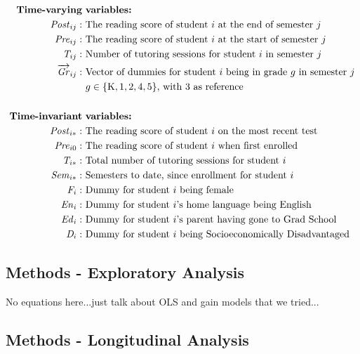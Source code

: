\documentclass[a0,landscape]{a0poster}
\begin{document}
\begin{multicols}{3}
\begin{align*}
\text{\textbf{Time-varying}} & \text{ \textbf{variables:}} \\
\mathit{Post}_{ij}: & \text{ The reading score of student } i \text{ at the end of semester } j \\
\mathit{Pre}_{ij}: & \text{ The reading score of student } i \text{ at the start of semester } j \\
\mathit{T}_{ij}: & \text{ Number of tutoring sessions for student } i  \text{ in semester } j \\
\overrightarrow{\mathit{Gr}}_{ij}: & \text{ Vector of dummies for student } i 
      \text{ being in grade } g \text{ in semester } j \\
  & ~ g \in \{\mathrm{K}, 1, 2, 4, 5\} \text {, with 3 as reference}  \\
\\
\text{\textbf{Time-invariant}} & \text{ \textbf{variables:}} \\
\mathit{Post}_{i*}: & \text{ The reading score of student } i \text{ on the most recent test } \\
\mathit{Pre}_{i0}: & \text{ The reading score of student } i \text{ when first enrolled } \\
\mathit{T}_{i*}: & \text{ Total number of tutoring sessions for student } i \\
\mathit{Sem}_{i*}: & \text{ Semesters to date, since enrollment for student } i \\
\mathit{F}_{i}: & \text{ Dummy for student } i  \text{ being female } \\ 
\mathit{En}_{i}: & \text{ Dummy for student } i \text{'s home language being English } \\ 
\mathit{Ed}_{i}: & \text{ Dummy for student } i \text{'s parent having gone to Grad School} \\ 
\mathit{D}_{i}: & \text{ Dummy for student } i \text{ being Socioeconomically Disadvantaged } \\ 
\end{align*}

\subsection*{Methods - Exploratory Analysis}

No equations here...just talk about OLS and gain models that we tried... 

\subsection*{Methods - Longitudinal Analysis}


\end{multicols}
\end{document}
